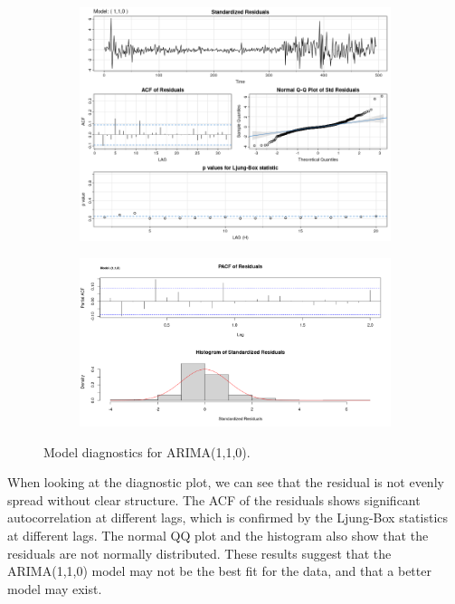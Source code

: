 \documentclass[12pt]{article}
\begin{document}
\begin{figure}[ht]
\centering

\begin{subfigure}[b]{0.6\textwidth}
\centering
\includegraphics[width=1\textwidth]{images/arima_110.png}
\label{fig:sub1}
\end{subfigure}

\begin{subfigure}[b]{0.6\textwidth}
\centering
\includegraphics[width=1\textwidth]{images/arima_110_examine.png}
\label{fig:sub2}
\end{subfigure}

\caption{Model diagnostics for ARIMA(1,1,0).}
\label{fig:test}
\end{figure}


When looking at the diagnostic plot, we can see that the residual is not evenly spread without clear structure. The ACF of the residuals shows significant autocorrelation at different lags, which is confirmed by the Ljung-Box statistics at different lags. The normal QQ plot and the histogram also show that the residuals are not normally distributed. These results suggest that the ARIMA(1,1,0) model may not be the best fit for the data, and that a better model may exist.
\end{document}
